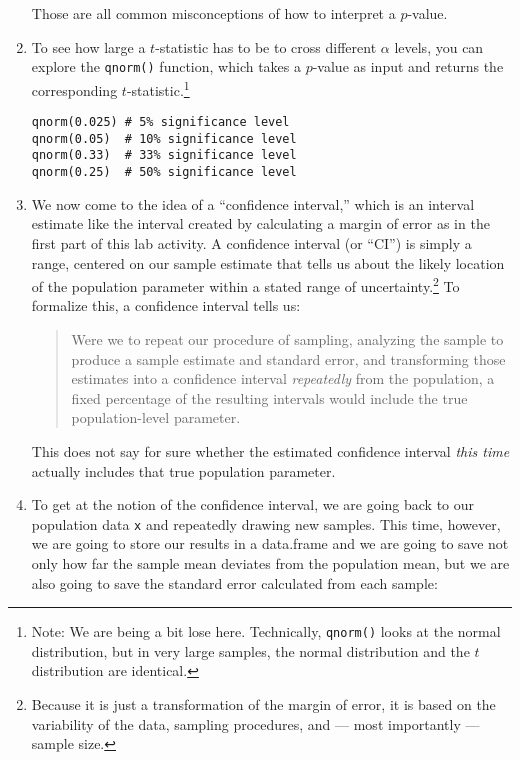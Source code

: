 \documentclass[a4paper,12pt]{article}
\begin{document}
\begin{enumerate}
\noindent Those are all common misconceptions of how to interpret a $p$-value.

\item To see how large a $t$-statistic has to be to cross different $\alpha$ levels, you can explore the \texttt{qnorm()} function, which takes a $p$-value as input and returns the corresponding $t$-statistic.\footnote{Note: We are being a bit lose here. Technically, \texttt{qnorm()} looks at the normal distribution, but in very large samples, the normal distribution and the $t$ distribution are identical.}

\begin{verbatim}
qnorm(0.025) # 5% significance level
qnorm(0.05)  # 10% significance level
qnorm(0.33)  # 33% significance level
qnorm(0.25)  # 50% significance level
\end{verbatim}

\item We now come to the idea of a ``confidence interval,'' which is an interval estimate like the interval created by calculating a margin of error as in the first part of this lab activity. A confidence interval (or ``CI'') is simply a range, centered on our sample estimate that tells us about the likely location of the population parameter within a stated range of uncertainty.\footnote{Because it is just a transformation of the margin of error, it is based on the variability of the data, sampling procedures, and --- most importantly --- sample size.} To formalize this, a confidence interval tells us:

\begin{quote}
Were we to repeat our procedure of sampling, analyzing the sample to produce a sample estimate and standard error, and transforming those estimates into a confidence interval \textit{repeatedly} from the population, a fixed percentage of the resulting intervals would include the true population-level parameter.
\end{quote}
        
\noindent This does not say for sure whether the estimated confidence interval \textit{this time} actually includes that true population parameter.

\item To get at the notion of the confidence interval, we are going back to our population data \texttt{x} and repeatedly drawing new samples. This time, however, we are going to store our results in a data.frame and we are going to save not only how far the sample mean deviates from the population mean, but we are also going to save the standard error calculated from each sample:


\end{enumerate}
\end{document}
